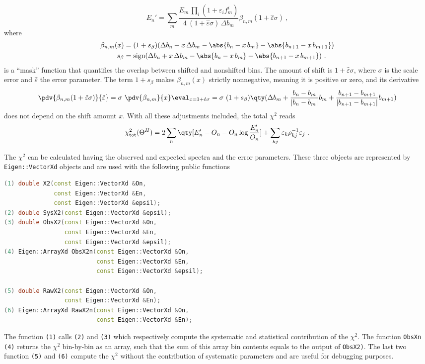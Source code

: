 \documentclass[a4paper, 11pt]{article}
\newcommand{\sk}{\hat\varepsilon}
\begin{document}
\begin{equation}
	E_n' = \sum_m \frac{E_m\,\textstyle\prod_i(1 + \varepsilon_i f^i_m)}%
	{4\ (1+\sk \sigma)\, \Delta b_m} \beta_{n, m}(1+\sk \sigma)\ ,
\end{equation}
where
\begin{align}
	\beta_{n, m}(x) &= (1 + s_\beta) (\Delta b_n + x\, \Delta b_m - \abs{b_n - x\, b_m} - \abs{b_{n+1} - x\, b_{m+1}} ) \notag \\
	s_\beta &= \text{sign} (\Delta b_n + x\, \Delta b_m - \abs{b_n - x\, b_m} - \abs{b_{n+1} - x\, b_{m+1}} )\ .
\end{align}
is a ``mask'' function that quantifies the overlap between shifted and nonshifted bins.
The amount of shift is $1+\sk \sigma$, where $\sigma$ is the scale error and $\sk$ the error parameter.
The term $1 + s_\beta$  makes $\beta_{n,m}(x)$ strictly nonnegative, meaning it is positive or zero, %
and its derivative
\begin{equation}
	\pdv{\beta_{n,m}(1+\sk\sigma)}{\sk} = 
	\sigma\ \pdv{\beta_{n,m}}{x}\eval_{x=1+\sk\sigma} = \sigma\ (1 + s_\beta)
	\qty(\Delta b_m + \frac{b_n - b_m}{|b_n - b_m|} b_m + \frac{b_{n+1} - b_{m+1}}{|b_{n+1} - b_{m+1}|} b_{m+1})
\end{equation}
does not depend on the shift amount $x$.
With all these adjustments included, the total $\chi^2$ reads
\begin{equation}
	\chi^2_\text{tot}(\Theta^H) = 2 \sum_n \qty[ E_n' - O_n - O_n \log \frac{E_n'}{O_n} ]
	+ \sum_{kj} \varepsilon_k \rho^{-1}_{kj} \varepsilon_j\ .
\end{equation}

The $\chi^2$ can be calculated having the observed and expected spectra and the error parameters.
These three objects are represented by \texttt{Eigen::VectorXd} objects and are used with the following public functions
\begin{lstlisting}[language=C++]
(1) double X2(const Eigen::VectorXd &On,
              const Eigen::VectorXd &En,
              const Eigen::VectorXd &epsil);
(2) double SysX2(const Eigen::VectorXd &epsil);
(3) double ObsX2(const Eigen::VectorXd &On,
                 const Eigen::VectorXd &En,
                 const Eigen::VectorXd &epsil);
(4) Eigen::ArrayXd ObsX2n(const Eigen::VectorXd &On,
                          const Eigen::VectorXd &En,
                          const Eigen::VectorXd &epsil);
    
(5) double RawX2(const Eigen::VectorXd &On,
                 const Eigen::VectorXd &En);
(6) Eigen::ArrayXd RawX2n(const Eigen::VectorXd &On,
                          const Eigen::VectorXd &En);
\end{lstlisting}
The function \texttt{(1)} calls \texttt{(2)} and \texttt{(3)} which respectively %
compute the systematic and statistical contribution of the $\chi^2$.
The function \texttt{ObsXn} \texttt{(4)} returns the $\chi^2$ bin-by-bin as an array, %
such that the sum of this array bin contents equals to the output of \texttt{ObsX2)}.
The last two function \texttt{(5)} and \texttt{(6)} compute the $\chi^2$ without the %
contribution of systematic parameters and are useful for debugging purposes.
\end{document}
